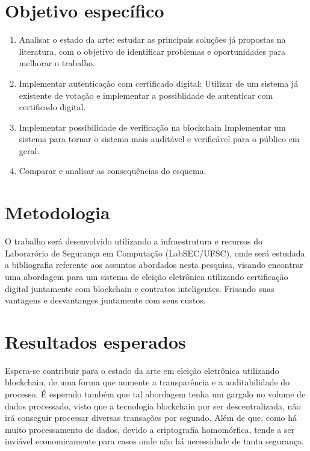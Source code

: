 \documentclass{ufsctex/ufsctex}
\begin{document}
\section{Objetivo específico}

\begin{enumerate}[label=\roman*.]
	\item Analisar o estado da arte: estudar as principais soluções
	já propostas na literatura, com o objetivo de identificar problemas
	e oportunidades para melhorar o trabalho.
	\item Implementar autenticação com certificado digital: Utilizar
	de um sistema já existente de votação e implementar a possiblidade
	de autenticar com certificado digital.
	\item Implementar possibilidade de verificação na blockchain
	Implementar um sistema para tornar o sistema mais auditável e 
	verificável para o público em geral.
	\item Comparar e analisar as consequências do esquema.
\end{enumerate}

\section{Metodologia}

O trabalho será desenvolvido utilizando a infraestrutura e recursos do
Laborarório de Segurança em Computação (LabSEC/UFSC), onde será estudada
a bibliografia referente aos assuntos abordados nesta pesquisa, visando
encontrar uma abordagem para um sistema de eleição eletrônica utilizando
certificação digital juntamente com blockchain e contratos inteligentes.
Frisando suas vantagens e desvantanges juntamente com seus custos.

\section{Resultados esperados}

Espera-se contribuir para o estado da arte em eleição eletrônica utilizando
blockchain, de uma forma que aumente a transparência e a auditabilidade do
processo. É esperado também que tal abordagem tenha um gargalo no volume de
dados processado, visto que a tecnologia blockchain por ser descentralizada,
não irá conseguir processar diversas transações por segundo. Além de que,
como há muito processamento de dados, devido a criptografia homomórfica,
tende a ser inviável economicamente para casos onde não há necessidade de
tanta segurança.
\end{document}

